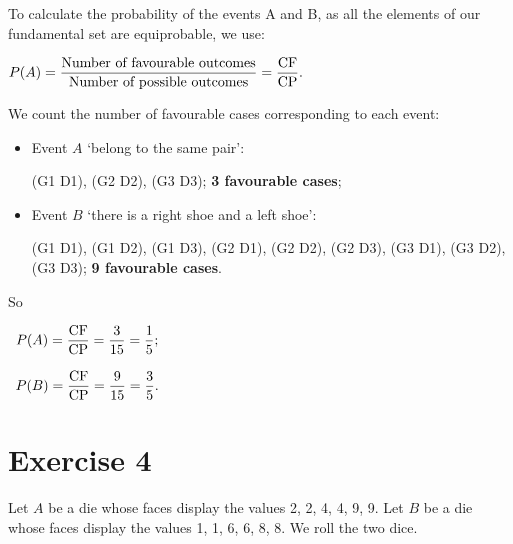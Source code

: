 \documentclass[12pt,thmsa]{article}
\begin{document}
To calculate the probability of the events A and B, as all the elements of our fundamental set are equiprobable, we use:
\begin{center}$P(A)= \displaystyle \frac{\text{Number of favourable outcomes}}{\text{Number of possible outcomes}}=\frac{\rm CF}{\rm CP}.$
\end{center}
\medskip

We count the number of favourable cases corresponding to each event:
\begin{itemize}
\item Event $A$ `belong to the same pair':
\begin{center} (G1 D1), (G2 D2), (G3 D3); \textbf{3 favourable cases}; \end{center}
\item Event $B$ `there is a right shoe and a left shoe': 
\begin{center}(G1 D1), (G1 D2), (G1 D3), (G2 D1), (G2 D2), (G2 D3), (G3 D1), (G3 D2),\\ (G3 D3); \textbf{9 favourable cases}.\end{center}
\end{itemize}
\medskip

So
\begin{center}
$ \begin{array}{c}
P(A)= \displaystyle \frac{\rm CF}{\rm CP}=\frac{3}{15}=\frac{1}{5};
\\
\\
P(B)=\displaystyle \frac{\rm CF}{\rm CP}=\frac{9}{15}=\frac{3}{5}.
\end{array}$
\end{center}


\section*{Exercise 4}
Let $A$ be a die whose faces display the values 2, 2, 4, 4, 9, 9.  Let $B$ be a die whose faces display the
values 1, 1, 6, 6, 8, 8. We roll the two dice.
\end{document}
